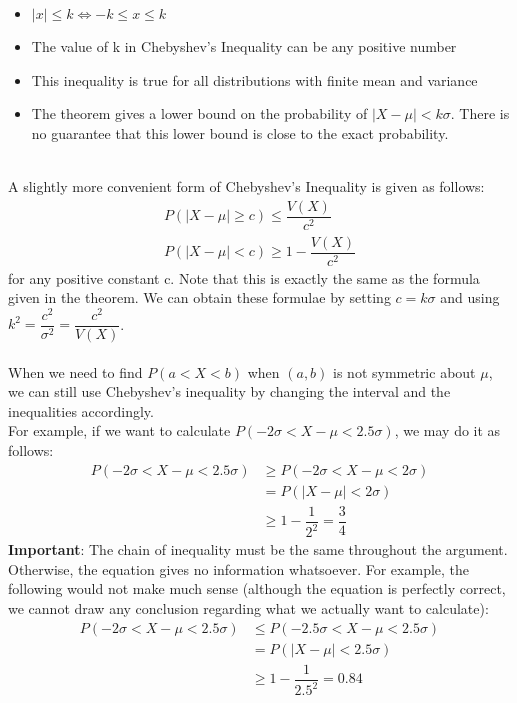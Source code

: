 \begin{note}
\end{note}
\begin{itemize}
    \item $|x| \leq k \iff -k \leq x \leq k$
    \item The value of k in Chebyshev's Inequality can be any positive number 
    \item This inequality is true for all distributions with finite mean and variance
    \item The theorem gives a lower bound on the probability of $|X-\mu| < k\sigma$. There is no guarantee that this lower bound is close to the exact probability.
\end{itemize}
\hfill \\
A slightly more convenient form of Chebyshev's Inequality is given as follows:
\begin{equation*}
\begin{split}
    P(|X - \mu| \geq c) \leq \dfrac{V(X)}{c^2} \\
    P(|X - \mu| < c) \geq 1 - \dfrac{V(X)}{c^2}
\end{split}
\end{equation*}
for any positive constant c. Note that this is exactly the same as the formula given in the theorem. We can obtain these formulae by setting $c = k\sigma$ and using $k^2 = \dfrac{c^2}{\sigma^2} = \dfrac{c^2}{V(X)}$. 
\\ \hfill \\
When we need to find $P(a < X < b)$ when $(a,b)$ is not symmetric about $\mu$, we can still use Chebyshev's inequality by changing the interval and the inequalities accordingly. \\
For example, if we want to calculate $P( -2\sigma < X - \mu < 2.5 \sigma)$, we may do it as follows:
\begin{equation*}
\begin{split}
P(-2\sigma < X - \mu < 2.5\sigma) & \geq P(-2\sigma < X - \mu < 2 \sigma) \\
& = P(|X - \mu| < 2\sigma) \\
& \geq 1 - \dfrac{1}{2^2} = \dfrac{3}{4}
\end{split}
\end{equation*}
\textbf{Important}: The chain of inequality must be the same throughout the argument. Otherwise, the equation gives no information whatsoever. For example, the following would not make much sense (although the equation is perfectly correct, we cannot draw any conclusion regarding what we actually want to calculate):
\begin{equation*}
\begin{split}
P(-2\sigma < X - \mu < 2.5\sigma) & \leq P(-2.5\sigma < X - \mu < 2.5\sigma) \\
&= P(|X - \mu| < 2.5\sigma) \\
& \geq 1 - \dfrac{1}{2.5^2} = 0.84
\end{split}
\end{equation*}

